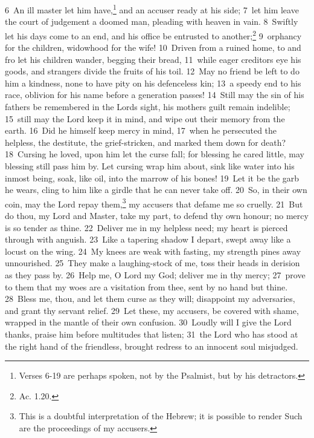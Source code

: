 \documentclass[10pt]{book} %
\begin{document}
\textcolor{benred8}{6}~An ill master let him have,\footnote[1]{Verses 6-19 are perhaps spoken, not by the Psalmist, but by his detractors.} and an accuser ready at his side; \textcolor{benred8}{7}~let him leave the court of judgement a doomed man, pleading with heaven in vain. \textcolor{benred8}{8}~Swiftly let his days come to an end, and his office be entrusted to another;\footnote[2]{Ac. 1.20.} \textcolor{benred8}{9}~orphancy for the children, widowhood for the wife! \textcolor{benred8}{10}~Driven from a ruined home, to and fro let his children wander, begging their bread, \textcolor{benred8}{11}~while eager creditors eye his goods, and strangers divide the fruits of his toil. \textcolor{benred8}{12}~May no friend be left to do him a kindness, none to have pity on his defenceless kin; \textcolor{benred8}{13}~a speedy end to his race, oblivion for his name before a generation passes! \textcolor{benred8}{14}~Still may the sin of his fathers be remembered in the Lord\textquotesingle s sight, his mother\textquotesingle s guilt remain indelible; \textcolor{benred8}{15}~still may the Lord keep it in mind, and wipe out their memory from the earth. \textcolor{benred8}{16}~Did he himself keep mercy in mind, \textcolor{benred8}{17}~when he persecuted the helpless, the destitute, the grief-stricken, and marked them down for death? \textcolor{benred8}{18}~Cursing he loved, upon him let the curse fall; for blessing he cared little, may blessing still pass him by. Let cursing wrap him about, sink like water into his inmost being, soak, like oil, into the marrow of his bones! \textcolor{benred8}{19}~Let it be the garb he wears, cling to him like a girdle that he can never take off.
\textcolor{benred8}{20}~So, in their own coin, may the Lord repay them,\footnote[3]{This is a doubtful interpretation of the Hebrew; it is possible to render \textasciigrave Such are the proceedings of my accusers\textquotesingle .} my accusers that defame me so cruelly. \textcolor{benred8}{21}~But do thou, my Lord and Master, take my part, to defend thy own honour; no mercy is so tender as thine. \textcolor{benred8}{22}~Deliver me in my helpless need; my heart is pierced through with anguish. \textcolor{benred8}{23}~Like a tapering shadow I depart, swept away like a locust on the wing. \textcolor{benred8}{24}~My knees are weak with fasting, my strength pines away unnourished. \textcolor{benred8}{25}~They make a laughing-stock of me, toss their heads in derision as they pass by. \textcolor{benred8}{26}~Help me, O Lord my God; deliver me in thy mercy; \textcolor{benred8}{27}~prove to them that my woes are a visitation from thee, sent by no hand but thine. \textcolor{benred8}{28}~Bless me, thou, and let them curse as they will; disappoint my adversaries, and grant thy servant relief. \textcolor{benred8}{29}~Let these, my accusers, be covered with shame, wrapped in the mantle of their own confusion. \textcolor{benred8}{30}~Loudly will I give the Lord thanks, praise him before multitudes that listen; \textcolor{benred8}{31}~the Lord who has stood at the right hand of the friendless, brought redress to an innocent soul misjudged.
\end{document}
